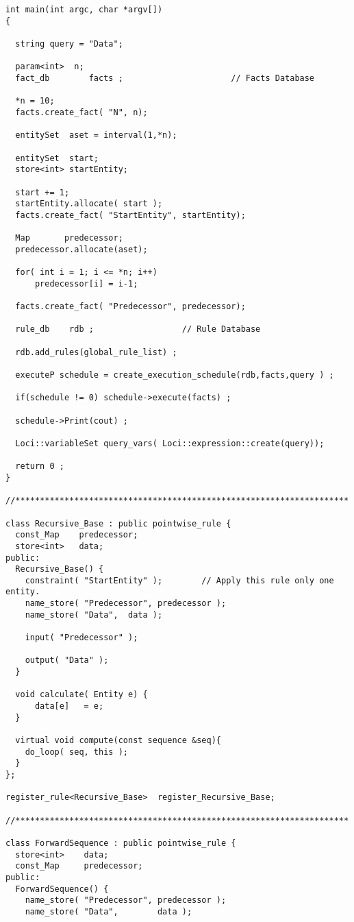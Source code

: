 \begin{verbatim}
int main(int argc, char *argv[]) 
{
  
  string query = "Data";

  param<int>  n;
  fact_db        facts ;                      // Facts Database
  
  *n = 10;
  facts.create_fact( "N", n);

  entitySet  aset = interval(1,*n);

  entitySet  start;
  store<int> startEntity;

  start += 1;
  startEntity.allocate( start );
  facts.create_fact( "StartEntity", startEntity);

  Map       predecessor;
  predecessor.allocate(aset);

  for( int i = 1; i <= *n; i++)
      predecessor[i] = i-1;

  facts.create_fact( "Predecessor", predecessor);

  rule_db    rdb ;                  // Rule Database
  
  rdb.add_rules(global_rule_list) ;

  executeP schedule = create_execution_schedule(rdb,facts,query ) ;

  if(schedule != 0) schedule->execute(facts) ;

  schedule->Print(cout) ;
  
  Loci::variableSet query_vars( Loci::expression::create(query));

  return 0 ;
}

//********************************************************************

class Recursive_Base : public pointwise_rule {
  const_Map    predecessor;
  store<int>   data;
public:
  Recursive_Base() {
    constraint( "StartEntity" );        // Apply this rule only one entity.
    name_store( "Predecessor", predecessor );
    name_store( "Data",  data );

    input( "Predecessor" );

    output( "Data" );
  }

  void calculate( Entity e) {
      data[e]   = e;
  }

  virtual void compute(const sequence &seq){
    do_loop( seq, this );
  }
};

register_rule<Recursive_Base>  register_Recursive_Base;

//********************************************************************

class ForwardSequence : public pointwise_rule {
  store<int>    data;
  const_Map     predecessor;
public:
  ForwardSequence() {
    name_store( "Predecessor", predecessor );
    name_store( "Data",        data );


\end{verbatim}
